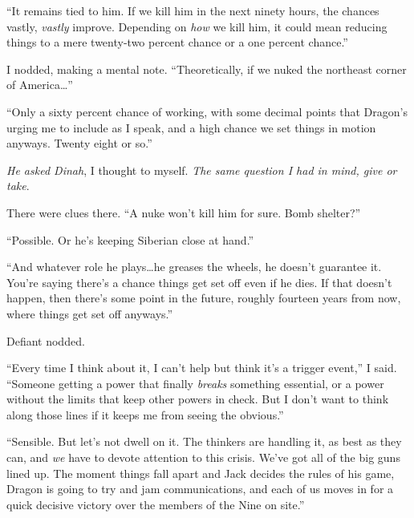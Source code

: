 ``It remains tied to him.  If we kill him in the next ninety hours, the chances vastly, \emph{vastly} improve.  Depending on \emph{how} we kill him, it could mean reducing things to a mere twenty-two percent chance or a one percent chance.''



I nodded, making a mental note.  ``Theoretically, if we nuked the northeast corner of America\ldots''



``Only a sixty percent chance of working, with some decimal points that Dragon's urging me to include as I speak, and a high chance we set things in motion anyways.  Twenty eight or so.''



\emph{He asked Dinah}, I thought to myself.  \emph{The same question I had in mind, give or take}.



There were clues there.  ``A nuke won't kill him for sure.  Bomb shelter?''



``Possible.  Or he's keeping Siberian close at hand.''



``And whatever role he plays\ldots he greases the wheels, he doesn't guarantee it.  You're saying there's a chance things get set off even if he dies.  If that doesn't happen, then there's some point in the future, roughly fourteen years from now, where things get set off anyways.''



Defiant nodded.



``Every time I think about it, I can't help but think it's a trigger event,'' I said.  ``Someone getting a power that finally \emph{breaks} something essential, or a power without the limits that keep other powers in check.  But I don't want to think along those lines if it keeps me from seeing the obvious.''



``Sensible.  But let's not dwell on it.  The thinkers are handling it, as best as they can, and \emph{we }have to devote attention to this crisis.  We've got all of the big guns lined up.  The moment things fall apart and Jack decides the rules of his game, Dragon is going to try and jam communications, and each of us moves in for a quick decisive victory over the members of the Nine on site.''



